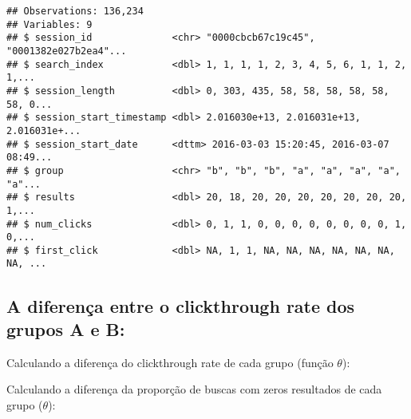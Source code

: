 \documentclass[]{article}
\newenvironment{Shaded}{\begin{snugshade}}{\end{snugshade}}
\newcommand{\ControlFlowTok}[1]{\textcolor[rgb]{0.13,0.29,0.53}{\textbf{#1}}}
\newcommand{\DataTypeTok}[1]{\textcolor[rgb]{0.13,0.29,0.53}{#1}}
\newcommand{\DecValTok}[1]{\textcolor[rgb]{0.00,0.00,0.81}{#1}}
\newcommand{\KeywordTok}[1]{\textcolor[rgb]{0.13,0.29,0.53}{\textbf{#1}}}
\newcommand{\NormalTok}[1]{#1}
\newcommand{\OperatorTok}[1]{\textcolor[rgb]{0.81,0.36,0.00}{\textbf{#1}}}
\newcommand{\StringTok}[1]{\textcolor[rgb]{0.31,0.60,0.02}{#1}}
\begin{document}
\begin{verbatim}
## Observations: 136,234
## Variables: 9
## $ session_id              <chr> "0000cbcb67c19c45", "0001382e027b2ea4"...
## $ search_index            <dbl> 1, 1, 1, 1, 2, 3, 4, 5, 6, 1, 1, 2, 1,...
## $ session_length          <dbl> 0, 303, 435, 58, 58, 58, 58, 58, 58, 0...
## $ session_start_timestamp <dbl> 2.016030e+13, 2.016031e+13, 2.016031e+...
## $ session_start_date      <dttm> 2016-03-03 15:20:45, 2016-03-07 08:49...
## $ group                   <chr> "b", "b", "b", "a", "a", "a", "a", "a"...
## $ results                 <dbl> 20, 18, 20, 20, 20, 20, 20, 20, 20, 1,...
## $ num_clicks              <dbl> 0, 1, 1, 0, 0, 0, 0, 0, 0, 0, 0, 1, 0,...
## $ first_click             <dbl> NA, 1, 1, NA, NA, NA, NA, NA, NA, NA, ...
\end{verbatim}

\hypertarget{a-diferenca-entre-o-clickthrough-rate-dos-grupos-a-e-b}{%
\subsection{A diferença entre o clickthrough rate dos grupos A e
B:}\label{a-diferenca-entre-o-clickthrough-rate-dos-grupos-a-e-b}}

Calculando a diferença do clickthrough rate de cada grupo (função
\(\theta\)):

\begin{Shaded}
\end{Shaded}

Calculando a diferença da proporção de buscas com zeros resultados de
cada grupo (\(\theta\)):
\end{document}
